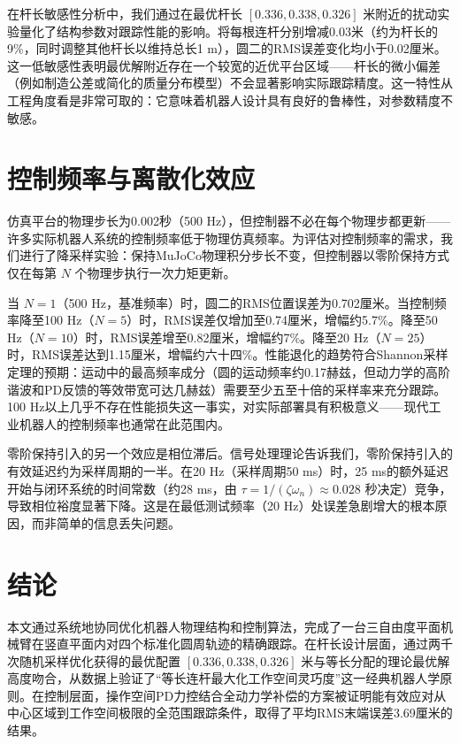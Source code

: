 \documentclass{article}
\begin{document}
在杆长敏感性分析中，我们通过在最优杆长 \([0.336, 0.338, 0.326]\) 米附近的扰动实验量化了结构参数对跟踪性能的影响。将每根连杆分别增减0.03米（约为杆长的9\%，同时调整其他杆长以维持总长1 m），圆二的RMS误差变化均小于0.02厘米。这一低敏感性表明最优解附近存在一个较宽的近优平台区域——杆长的微小偏差（例如制造公差或简化的质量分布模型）不会显著影响实际跟踪精度。这一特性从工程角度看是非常可取的：它意味着机器人设计具有良好的鲁棒性，对参数精度不敏感。

\section{控制频率与离散化效应}

仿真平台的物理步长为0.002秒（500 Hz），但控制器不必在每个物理步都更新——许多实际机器人系统的控制频率低于物理仿真频率。为评估对控制频率的需求，我们进行了降采样实验：保持MuJoCo物理积分步长不变，但控制器以零阶保持方式仅在每第 \(N\) 个物理步执行一次力矩更新。

当 \(N=1\)（500 Hz，基准频率）时，圆二的RMS位置误差为0.702厘米。当控制频率降至100 Hz（\(N=5\)）时，RMS误差仅增加至0.74厘米，增幅约5.7\%。降至50 Hz（\(N=10\)）时，RMS误差增至0.82厘米，增幅约7\%。降至20 Hz（\(N=25\)）时，RMS误差达到1.15厘米，增幅约六十四\%。性能退化的趋势符合Shannon采样定理的预期：运动中的最高频率成分（圆的运动频率约0.17赫兹，但动力学的高阶谐波和PD反馈的等效带宽可达几赫兹）需要至少五至十倍的采样率来充分跟踪。100 Hz以上几乎不存在性能损失这一事实，对实际部署具有积极意义——现代工业机器人的控制频率也通常在此范围内。

零阶保持引入的另一个效应是相位滞后。信号处理理论告诉我们，零阶保持引入的有效延迟约为采样周期的一半。在20 Hz（采样周期50 ms）时，25 ms的额外延迟开始与闭环系统的时间常数（约28 ms，由 \(\tau = 1/(\zeta\omega_n) \approx 0.028\) 秒决定）竞争，导致相位裕度显著下降。这是在最低测试频率（20 Hz）处误差急剧增大的根本原因，而非简单的信息丢失问题。

\section{结论}

本文通过系统地协同优化机器人物理结构和控制算法，完成了一台三自由度平面机械臂在竖直平面内对四个标准化圆周轨迹的精确跟踪。在杆长设计层面，通过两千次随机采样优化获得的最优配置 \([0.336, 0.338, 0.326]\) 米与等长分配的理论最优解高度吻合，从数据上验证了“等长连杆最大化工作空间灵巧度”这一经典机器人学原则。在控制层面，操作空间PD力控结合全动力学补偿的方案被证明能有效应对从中心区域到工作空间极限的全范围跟踪条件，取得了平均RMS末端误差3.69厘米的结果。
\end{document}
